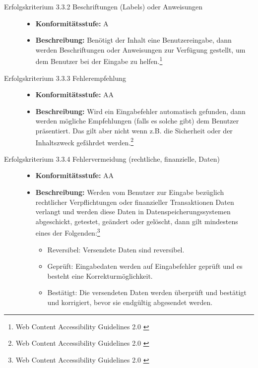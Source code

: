 \begin{description}
\begin{description}
		\item[Erfolgskriterium 3.3.2 Beschriftungen (Labels) oder Anweisungen]\hfill
		\begin{itemize}
			\item \textbf{Konformitätsstufe:} A
			\item \textbf{Beschreibung:} Benötigt der Inhalt eine Benutzereingabe, dann werden Beschriftungen oder Anweisungen zur Verfügung gestellt, um dem Benutzer bei der 
			Eingabe zu helfen.\footnote{Web Content Accessibility Guidelines 2.0 \cite{WCAG2.0}}
		\end{itemize}
		
		\item[Erfolgskriterium 3.3.3 Fehlerempfehlung]\hfill
		\begin{itemize}
			\item \textbf{Konformitätsstufe:} AA
			\item \textbf{Beschreibung:} Wird ein Eingabefehler automatisch gefunden, dann werden mögliche Empfehlungen (falls es solche gibt) dem Benutzer präsentiert. Das gilt aber 
			nicht wenn z.B. die Sicherheit oder der Inhaltszweck gefährdet werden.\footnote{Web Content Accessibility Guidelines 2.0 \cite{WCAG2.0}}
		\end{itemize}
		
		\item[Erfolgskriterium 3.3.4 Fehlervermeidung (rechtliche, finanzielle, Daten)]\hfill
		\begin{itemize}
			\item \textbf{Konformitätsstufe:} AA
			\item \textbf{Beschreibung:} Werden vom Benutzer zur Eingabe bezüglich rechtlicher Verpflichtungen oder finanzieller Transaktionen Daten verlangt und werden diese Daten 
			in Datenspeicherungssystemen abgeschickt, getestet, geändert oder gelöscht, dann gilt mindestens eines der 
			Folgenden:\footnote{Web Content Accessibility Guidelines 2.0 \cite{WCAG2.0}}
			\begin{itemize}
				\item Reversibel: Versendete Daten sind reversibel.
				\item Geprüft: Eingabedaten werden auf Eingabefehler geprüft und es besteht eine Korrekturmöglichkeit. 
				\item Bestätigt: Die versendeten Daten werden überprüft und bestätigt und korrigiert, bevor sie endgültig abgesendet werden. 
			\end{itemize}
		\end{itemize}
		

\end{description}
\end{description}
